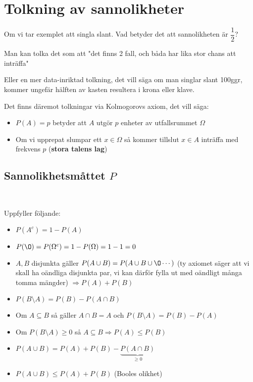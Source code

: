\section{Tolkning av sannolikheter}
\par\bigskip
\noindent Om vi tar exemplet att singla slant. Vad betyder det att sannolikheten är $\dfrac{1}{2}$?\par
\noindent Man kan tolka det som att "det finns 2 fall, och båda har lika stor chans att inträffa"\par
\noindent Eller en mer data-inriktad tolkning, det vill säga om man singlar slant 100ggr, kommer ungefär hälften av kasten resultera i krona eller klave.
\par\bigskip
\noindent Det finns däremot tolkningar via Kolmogorovs axiom, det vill säga:
\begin{itemize}
  \item $P(A) = p$  betyder att $A$ utgör $p$ enheter av utfallsrummet $\Omega$
  \item Om vi upprepat slumpar ett $x\in\Omega$ så kommer tillslut $x\in A$  inträffa med frekvens $p$ (\textbf{stora talens lag})
\end{itemize}
\par\bigskip
\subsection{Sannolikhetsmåttet $P$}\hfill\\
\par\noindent Uppfyller följande:
\par\bigskip
\begin{itemize}
  \item $P(A^c) = 1-P(A)$
  \item $P(\O) = P(\Omega^c) = 1-P(\Omega) = 1-1 = 0$
  \item $A,B$ disjunkta gäller $P(A\cup B) = P(A\cup B \cup\O\cdots)$ (ty axiomet säger att vi skall ha oändliga disjunkta par, vi kan därför fylla ut med oändligt många tomma mängder) $\Rightarrow P(A)+P(B)$
  \item $P(B\setminus A) = P(B)-P(A\cap B)$
  \item Om $A\subseteq B$ så gäller $A\cap B = A$ och $P(B\setminus A) = P(B)-P(A)$
  \item Om $P(B\setminus A)\geq0$ så $A\subseteq B\Rightarrow P(A)\leq P(B)$
  \item $P(A\cup B) = P(A)+P(B)-\underbrace{P(A\cap B)}_{\text{$\geq0$}}$
  \item $P(A\cup B) \leq P(A)+P(B)$ (Booles olikhet)
\end{itemize}
\par\bigskip

